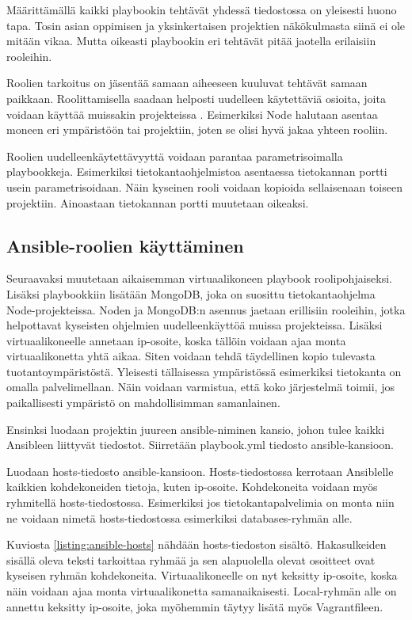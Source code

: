 Määrittämällä kaikki playbookin tehtävät yhdessä tiedostossa on yleisesti huono tapa. Tosin asian oppimisen ja yksinkertaisen projektien näkökulmasta siinä ei ole mitään vikaa. Mutta oikeasti playbookin eri tehtävät pitää jaotella erilaisiin rooleihin.

Roolien tarkoitus on jäsentää samaan aiheeseen kuuluvat tehtävät samaan paikkaan. Roolittamisella saadaan helposti uudelleen käytettäviä osioita, joita voidaan käyttää muissakin projekteissa \cite{link:ansible-roles-and-includes}. Esimerkiksi Node halutaan asentaa moneen eri ympäristöön tai projektiin, joten se olisi hyvä jakaa yhteen rooliin.

Roolien uudelleenkäytettävyyttä voidaan parantaa parametrisoimalla playbookkeja. Esimerkiksi tietokantaohjelmistoa asentaessa tietokannan portti usein parametrisoidaan. Näin kyseinen rooli voidaan kopioida sellaisenaan toiseen projektiin. Ainoastaan tietokannan portti muutetaan oikeaksi.

\subsection{Ansible-roolien käyttäminen}

Seuraavaksi muutetaan aikaisemman virtuaalikoneen playbook roolipohjaiseksi. Lisäksi playbookkiin lisätään MongoDB, joka on suosittu tietokantaohjelma Node-projekteissa. Noden ja MongoDB:n asennus jaetaan erillisiin rooleihin, jotka helpottavat kyseisten ohjelmien uudelleenkäyttöä muissa projekteissa. Lisäksi virtuaalikoneelle annetaan ip-osoite, koska tällöin voidaan ajaa monta virtuaalikonetta yhtä aikaa. Siten voidaan tehdä täydellinen kopio tulevasta tuotantoympäristöstä. Yleisesti tällaisessa ympäristössä esimerkiksi tietokanta on omalla palvelimellaan. Näin voidaan varmistua, että koko järjestelmä toimii, jos paikallisesti ympäristö on mahdollisimman samanlainen.

Ensinksi luodaan projektin juureen ansible-niminen kansio, johon tulee kaikki Ansibleen liittyvät tiedostot. Siirretään playbook.yml tiedosto ansible-kansioon.

Luodaan hosts-tiedosto ansible-kansioon. Hosts-tiedostossa kerrotaan Ansiblelle kaikkien kohdekoneiden tietoja, kuten ip-osoite. Kohdekoneita voidaan myös ryhmitellä hosts-tiedostossa. Esimerkiksi jos tietokantapalvelimia on monta niin ne voidaan nimetä hosts-tiedostossa esimerkiksi databases-ryhmän alle.

Kuviosta \ref{listing:ansible-hosts} nähdään hosts-tiedoston sisältö. Hakasulkeiden sisällä oleva teksti tarkoittaa ryhmää ja sen alapuolella olevat osoitteet ovat kyseisen ryhmän kohdekoneita. Virtuaalikoneelle on nyt keksitty ip-osoite, koska näin voidaan ajaa monta virtuaalikonetta samanaikaisesti. Local-ryhmän alle on annettu keksitty ip-osoite, joka myöhemmin täytyy lisätä myös Vagrantfileen.

